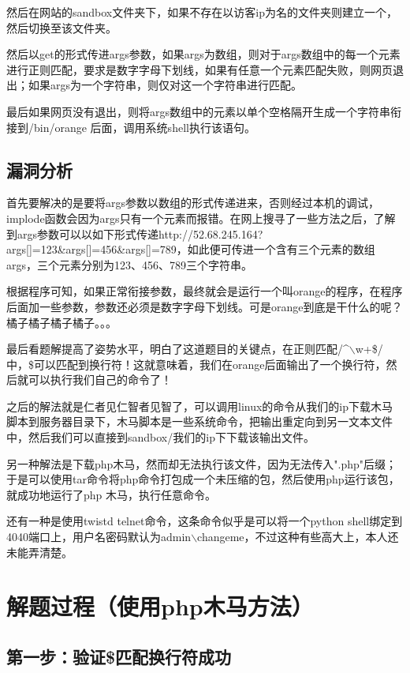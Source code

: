 \documentclass[a4paper,UTF8]{ctexart}
\begin{document}
然后在网站的sandbox文件夹下，如果不存在以访客ip为名的文件夹则建立一个，然后切换至该文件夹。

然后以get的形式传进args参数，如果args为数组，则对于args数组中的每一个元素进行正则匹配，要求是数字字母下划线，如果有任意一个元素匹配失败，则网页退出；如果args为一个字符串，则仅对这一个字符串进行匹配。

最后如果网页没有退出，则将args数组中的元素以单个空格隔开生成一个字符串衔接到/bin/orange 后面，调用系统shell执行该语句。

\subsection{漏洞分析}

首先要解决的是要将args参数以数组的形式传递进来，否则经过本机的调试，implode函数会因为args只有一个元素而报错。在网上搜寻了一些方法之后，了解到args参数可以以如下形式传递http://52.68.245.164?args[]=123\&args[]=456\&args[]=789，如此便可传进一个含有三个元素的数组args，三个元素分别为123、456、789三个字符串。

根据程序可知，如果正常衔接参数，最终就会是运行一个叫orange的程序，在程序后面加一些参数，参数还必须是数字字母下划线。可是orange到底是干什么的呢？橘子橘子橘子橘子。。。

最后看题解提高了姿势水平，明白了这道题目的关键点，在正则匹配/\^{}$\backslash$w+\$/中，\$可以匹配到换行符！这就意味着，我们在orange后面输出了一个换行符，然后就可以执行我们自己的命令了！

之后的解法就是仁者见仁智者见智了，可以调用linux的命令从我们的ip下载木马脚本到服务器目录下，木马脚本是一些系统命令，把输出重定向到另一文本文件中，然后我们可以直接到sandbox/我们的ip下下载该输出文件。

另一种解法是下载php木马，然而却无法执行该文件，因为无法传入".php"后缀；于是可以使用tar命令将php命令打包成一个未压缩的包，然后使用php运行该包，就成功地运行了php 木马，执行任意命令。

还有一种是使用twistd telnet命令，这条命令似乎是可以将一个python shell绑定到4040端口上，用户名密码默认为admin$\backslash$changeme，不过这种有些高大上，本人还未能弄清楚。

\section{解题过程（使用php木马方法）}

\subsection{第一步：验证\$匹配换行符成功}
\end{document}
